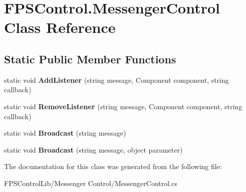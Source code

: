 \hypertarget{class_f_p_s_control_1_1_messenger_control}{\section{F\-P\-S\-Control.\-Messenger\-Control Class Reference}
\label{class_f_p_s_control_1_1_messenger_control}
}
\subsection*{Static Public Member Functions}
\begin{DoxyCompactItemize}
\item 
\hypertarget{class_f_p_s_control_1_1_messenger_control_a3e009a7a4ae07046812a2b4314c46c2a}{static void {\bfseries Add\-Listener} (string message, Component component, string callback)}\label{class_f_p_s_control_1_1_messenger_control_a3e009a7a4ae07046812a2b4314c46c2a}

\item 
\hypertarget{class_f_p_s_control_1_1_messenger_control_a734e11763224c16c2851249e92e98e74}{static void {\bfseries Remove\-Listener} (string message, Component component, string callback)}\label{class_f_p_s_control_1_1_messenger_control_a734e11763224c16c2851249e92e98e74}

\item 
\hypertarget{class_f_p_s_control_1_1_messenger_control_a806522ac72487b6e5ccf15b15129a41f}{static void {\bfseries Broadcast} (string message)}\label{class_f_p_s_control_1_1_messenger_control_a806522ac72487b6e5ccf15b15129a41f}

\item 
\hypertarget{class_f_p_s_control_1_1_messenger_control_a524b9af62d3a79dd19f377e887b7968e}{static void {\bfseries Broadcast} (string message, object parameter)}\label{class_f_p_s_control_1_1_messenger_control_a524b9af62d3a79dd19f377e887b7968e}

\end{DoxyCompactItemize}


The documentation for this class was generated from the following file\-:\begin{DoxyCompactItemize}
\item 
F\-P\-S\-Control\-Lib/\-Messenger Control/Messenger\-Control.\-cs\end{DoxyCompactItemize}
